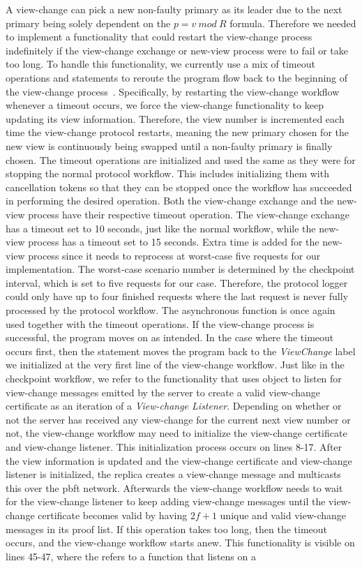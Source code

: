 A view-change can pick a new non-faulty primary as its leader due to the next primary being solely dependent on the $p = v ~mod~ R$ formula. Therefore we needed to implement a functionality that could restart the view-change process indefinitely if the view-change exchange or new-view process were to fail or take too long. To handle this functionality, we currently use a mix of timeout operations and  statements to reroute the program flow back to the beginning of the view-change process~\cite{WEB:goto}. Specifically, by restarting the view-change workflow whenever a timeout occurs, we force the view-change functionality to keep updating its view information. Therefore, the view number is incremented each time the view-change protocol restarts, meaning the new primary chosen for the new view is continuously being swapped until a non-faulty primary is finally chosen. The timeout operations are initialized and used the same as they were for stopping the normal protocol workflow. This includes initializing them with cancellation tokens so that they can be stopped once the workflow has succeeded in performing the desired operation. Both the view-change exchange and the new-view process have their respective timeout operation. The view-change exchange has a timeout set to 10 seconds, just like the normal workflow, while the new-view process has a timeout set to 15 seconds. Extra time is added for the new-view process since it needs to reprocess at worst-case five requests for our implementation. The worst-case scenario number is determined by the checkpoint interval, which is set to five requests for our case. Therefore, the protocol logger could only have up to four finished requests where the last request is never fully processed by the protocol workflow. The  asynchronous function is once again used together with the timeout operations. If the view-change process is successful, the program moves on as intended. In the case where the timeout occurs first, then the  statement moves the program back to the \emph{ViewChange} label we initialized at the very first line of the view-change workflow. Just like in the checkpoint workflow, we refer to the functionality that uses  object to listen for view-change messages emitted by the server to create a valid view-change certificate as an iteration of a \emph{View-change Listener}. Depending on whether or not the server has received any view-change for the current next view number or not, the view-change workflow may need to initialize the view-change certificate and view-change listener. This initialization process occurs on lines 8-17. After the view information is updated and the view-change certificate and view-change listener is initialized, the replica creates a view-change message and multicasts this over the \ac{pbft} network. Afterwards the view-change workflow needs to wait for the view-change listener to keep adding view-change messages until the view-change certificate becomes valid by having $2f+1$ unique and valid view-change messages in its proof list. If this operation takes too long, then the timeout occurs, and the view-change workflow starts anew. This functionality is visible on lines 45-47, where the  refers to a function that listens on a 